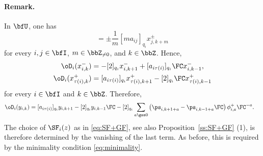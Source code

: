 \documentclass[reqno]{amsart}
\numberwithin{equation}{section}
\newenvironment{remark}{\medskip\paragraph{{\bf Remark.}}}{\par\medskip}
\begin{document}
\begin{remark}
In $\bfU$, one has
\begin{equation}
	[h_{i,m},x^{\pm}_{j,k}]=\pm\frac{1}{m}[ma_{ij}]_{q_i}x^{\pm}_{j,k+m}	
\end{equation}
for every $i,j\in\bfI$, $m\in\bbZ_{\neq0}$, and $k\in\bbZ$. Hence,
\begin{align}
	\oD_i(x^-_{i,k})&=-[2]_{q_i}x^-_{i,k+1}+[a_{i\tau(i)}]_{q_i}\FC x^-_{i,k-1},\\
	\oD_i(x^+_{\tau(i),k})&=[a_{i\tau(i)}]_{q_i}x^+_{\tau(i),k+1}-[2]_{q_i}\FC x^+_{\tau(i),k-1}	
\end{align}	
for every $i\in\bfI$ and $k\in\bbZ$. Therefore,
	\begin{equation}
	\begin{aligned}
	\oD_i(y_{i,k})
	&=[a_{i\tau(i)}]_{q_i}y_{i,k+1}-[2]_{q_i}y_{i,k-1}\FC
	-[2]_{q_i}\sum_{a\ges0}\left(\ps_{i,k+1+a}-\ps_{i,k-1+a}\FC\right)\phi^+_{i,a}\FC^{-a}.
	\end{aligned}
\end{equation}	
The choice of $\SF_i(z)$ as in \eqref{eq:SF+GF}, see also Proposition~\ref{ss:SF+GF} (1), 
is therefore determined by the vanishing of the last term. As before, this is required by the minimality condition \eqref{eq:minimality}.
\hfill\rmkend
\end{remark}
\end{document}
